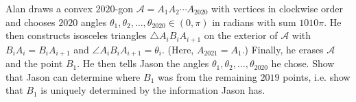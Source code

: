 Alan draws a convex $2020$-gon $\mathcal{A}=A_1A_2\dotsm A_{2020}$ with vertices in clockwise order and chooses $2020$ angles $\theta_1, \theta_2, \dotsc, \theta_{2020}\in (0, \pi)$ in radians with sum $1010\pi$. He then constructs isosceles triangles $\triangle A_iB_iA_{i+1}$ on the exterior of $\mathcal{A}$ with $B_iA_i=B_iA_{i+1}$ and $\angle A_iB_iA_{i+1}=\theta_i$. (Here, $A_{2021}=A_1$.) Finally, he erases $\mathcal{A}$ and the point $B_1$. He then tells Jason the angles $\theta_1, \theta_2, \dotsc, \theta_{2020}$ he chose. Show that Jason can determine where $B_1$ was from the remaining $2019$ points, i.e. show that $B_1$ is uniquely determined by the information Jason has.

